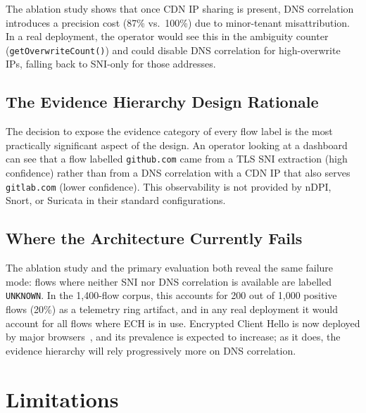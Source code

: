\documentclass[conference]{IEEEtran}
\begin{document}
The ablation study shows that once CDN IP sharing is present,
DNS correlation introduces a precision cost (87\% vs.\ 100\%)
due to minor-tenant misattribution.
In a real deployment, the operator would see this in the ambiguity
counter (\texttt{getOverwriteCount()}) and could disable DNS correlation
for high-overwrite IPs, falling back to SNI-only for those addresses.

\subsection{The Evidence Hierarchy Design Rationale}

The decision to expose the evidence category of every flow label is
the most practically significant aspect of the design.
An operator looking at a dashboard can see that a flow labelled
\texttt{github.com} came from a TLS SNI extraction (high confidence)
rather than from a DNS correlation with a CDN IP that also serves
\texttt{gitlab.com} (lower confidence).
This observability is not provided by nDPI, Snort, or Suricata in
their standard configurations.

\subsection{Where the Architecture Currently Fails}

The ablation study and the primary evaluation both reveal the
same failure mode: flows where neither SNI nor DNS correlation is
available are labelled \texttt{UNKNOWN}.
In the 1,400-flow corpus, this accounts for 200 out of 1,000 positive
flows (20\%) as a telemetry ring artifact, and in any real deployment
it would account for all flows where ECH is in use.
Encrypted Client Hello is now deployed by major browsers~\cite{tls13},
and its prevalence is expected to increase; as it does, the
evidence hierarchy will rely progressively more on DNS correlation.

\section{Limitations}
\label{sec:limitations}
\end{document}
